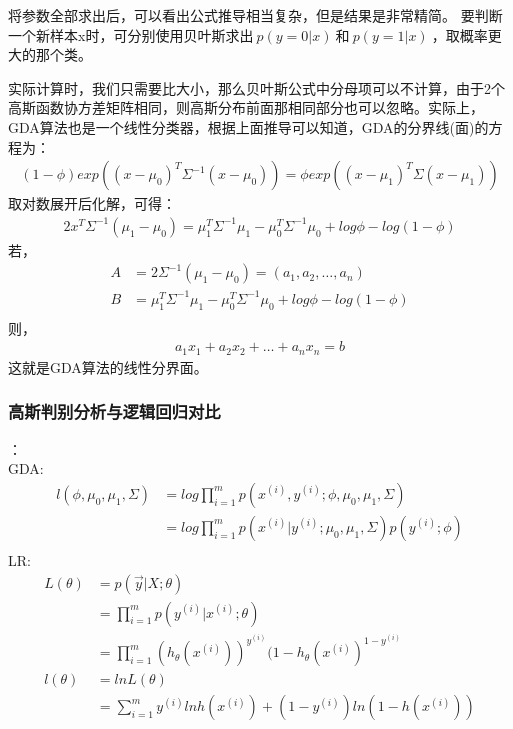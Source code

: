 将参数全部求出后，可以看出公式推导相当复杂，但是结果是非常精简。
要判断一个新样本x时，可分别使用贝叶斯求出$~p(y=0|x)~$和$~p(y=1|x)~$，取概率更大的那个类。

实际计算时，我们只需要比大小，那么贝叶斯公式中分母项可以不计算，由于2个高斯函数协方差矩阵相同，则高斯分布前面那相同部分也可以忽略。实际上，GDA算法也是一个线性分类器，根据上面推导可以知道，GDA的分界线(面)的方程为：
\begin{equation}\nonumber
\begin{split}
  (1-\phi)exp((x-\mu_0)^T\Sigma^{-1}(x-\mu_0))=\phi exp((x-\mu_1)^T\Sigma(x-\mu_1))
\end{split}
\end{equation}
取对数展开后化解，可得：
\begin{equation}\nonumber
\begin{split}
  2x^T\Sigma^{-1}(\mu_1-\mu_0)=\mu_1^T\Sigma^{-1}\mu_1-\mu_0^T\Sigma^{-1}\mu_0+log\phi-log(1-\phi)
\end{split}
\end{equation}
若，
\begin{equation}\nonumber
\begin{split}
  A&=2\Sigma^{-1}(\mu_1-\mu_0)=(a_1,a_2,\ldots,a_n)\\
  B&=\mu_1^T\Sigma^{-1}\mu_1-\mu_0^T\Sigma^{-1}\mu_0+log\phi-log(1-\phi)\\
\end{split}
\end{equation}
则，
\begin{equation}\nonumber
\begin{split}
  a_1x_1+a_2x_2+\ldots+a_nx_n=b
\end{split}
\end{equation}
这就是GDA算法的线性分界面。
\subsubsection{高斯判别分析与逻辑回归对比}
：\\
GDA:
\begin{equation}\nonumber
\begin{split}
  l(\phi,\mu_0,\mu_1,\Sigma)&=log\prod_{i=1}^{m}p(x^{(i)},y^{(i)};\phi,\mu_0,\mu_1,\Sigma)\\
  &=log\prod_{i=1}^{m}p(x^{(i)}|y^{(i)};\mu_0,\mu_1,\Sigma)p(y^{(i)};\phi)\\
\end{split}
\end{equation}
LR:
\begin{equation}\nonumber
\begin{split}
  L(\theta) &= p(\overrightarrow{y}|X;\theta)\\
            &= \prod_{i=1}^{m}p(y^{(i)}|x^{(i)};\theta)\\
            &= \prod_{i=1}^{m}(h_\theta(x^{(i)}))^{y^{(i)}}(1-h_\theta(x^{(i)})^{1-y^{(i)}}\\
  l(\theta) &= ln L(\theta)\\
            &= \sum_{i=1}^{m}y^{(i)}lnh(x^{(i)})+(1-y^{(i)})ln(1-h(x^{(i)}))
\end{split}
\end{equation}


